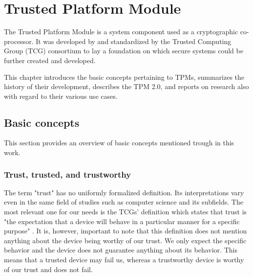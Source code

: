 \chapter{Trusted Platform Module}
The Trusted Platform Module is a system component used as a cryptographic co-processor. It was developed by and standardized by the Trusted Computing Group (TCG) consortium to lay a foundation on which secure systems could be further created and developed. 

This chapter introduces the basic concepts pertaining to TPMs, summarizes the history of their development, describes the TPM 2.0, and reports on research also with regard to their various use cases. 

\section{Basic concepts}
This section provides an overview of basic concepts mentioned trough in this work.

\subsection{Trust, trusted, and trustworthy}
The term "trust" has no uniformly formalized definition. Its interpretations vary even in the same field of studies such as computer science and its subfields. The most relevant one for our needs is the TCGs' definition which states that trust is "the expectation that a device will behave in a particular manner for a specific purpose" \cite{tcg_arch_overview}. It is, however, important to note that this definition does not mention anything about the device being worthy of our trust. We only expect the specific behavior and the device does not guarantee anything about its behavior. This means that a trusted device may fail us, whereas a trustworthy device is worthy of our trust and does not fail.

